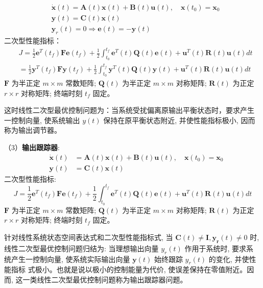 \documentclass[UTF8]{ctexart}
\begin{document}
  $$
  \begin{aligned}
  &\dot{\boldsymbol{x}}(t)=\boldsymbol{A}(t) \boldsymbol{x}(t)+\boldsymbol{B}(t) \boldsymbol{u}(t), \quad \boldsymbol{x}\left(t_{0}\right)=\boldsymbol{x}_{0}\\
  &\boldsymbol{y}(t)=\boldsymbol{C}(t) \boldsymbol{x}(t) \\
  &\boldsymbol{y}_{r}(t)=0 \Rightarrow \boldsymbol{e}(t)=-\boldsymbol{y}(t)
  \end{aligned}
  $$
  二次型性能指标：
  $$
  \begin{aligned}
  &J=\frac{1}{2} \boldsymbol{e}^{T}\left(t_{f}\right) \boldsymbol{F e}\left(t_{f}\right)+\frac{1}{2} \int_{t_{0}}^{t_{f}} \boldsymbol{e}^{T}(t) \boldsymbol{Q}(t) \boldsymbol{e}(t)+\boldsymbol{u}^{T}(t) \boldsymbol{R}(t) \boldsymbol{u}(t) d t \\
  &=\frac{1}{2} \boldsymbol{y}^{T}\left(t_{f}\right) \boldsymbol{F} \boldsymbol{y}\left(t_{f}\right)+\frac{1}{2} \int_{t_{0}}^{t_{f}} \boldsymbol{y}^{T}(t) \boldsymbol{Q}(t) \boldsymbol{y}(t)+\boldsymbol{u}^{T}(t) \boldsymbol{R}(t) \boldsymbol{u}(t) d t
  \end{aligned}
  $$
  $\boldsymbol{F}$ 为半正定 $m \times m$ 常数矩阵; $\boldsymbol{Q}(t)$ 为半正定 $m \times m$ 对称矩阵; $\boldsymbol{R}(t)$ 为正定 $r \times r$ 对称矩阵; 终端时刻 $t_{f}$ 固定。
  
  这时线性二次型最优控制问题为：当系统受扰偏离原输出平衡状态时，要求产生 一控制向量, 使系统输出 $y(t)$ 保持在原平衡状态附近, 并使性能指标极小, 因而 称为输出调节器。
  \par （3）\textbf{输出跟踪器}:
  $$\quad \begin{aligned} \dot{\boldsymbol{x}}(t) &=\boldsymbol{A}(t) \boldsymbol{x}(t)+\boldsymbol{B}(t) \boldsymbol{u}(t), \quad \boldsymbol{x}\left(t_{0}\right)=\boldsymbol{x}_{0} \\ \boldsymbol{y}(t) &=\boldsymbol{C}(t) \boldsymbol{x}(t) \end{aligned}$$
  二次型性能指标: $$\quad J=\frac{1}{2} \boldsymbol{e}^{T}\left(t_{f}\right) \boldsymbol{F e}\left(t_{f}\right)+\frac{1}{2} \int_{t_{0}}^{t_{f}} \boldsymbol{e}^{T}(t) \boldsymbol{Q}(t) \boldsymbol{e}(t)+\boldsymbol{u}^{T}(t) \boldsymbol{R}(t) \boldsymbol{u}(t) d t \quad $$
  $\boldsymbol{F}$ 为半正定 $m \times m$ 常数矩阵; $\boldsymbol{Q}(t)$ 为半正定 $m \times m$ 对称矩阵; $\boldsymbol{R}(t)$ 为正定 $r \times r$ 对称矩阵; 终端时刻 $t_{f}$ 固定。
  
  针对线性系统状态空间表达式和二次型性能指标式, 当 $\boldsymbol{C}(t) \neq \boldsymbol{I}, \boldsymbol{y}_{\boldsymbol{r}}(t) \neq 0$ 时, 线性二次型最优控制问题归结为: 当理想输出向量 $y_{r}(t)$ 作用于系统时, 要求系 统产生一控制向量, 使系统实际输出向量 $\boldsymbol{y}(t)$ 始终跟踪 $y_{r}(t)$ 的变化, 并使性能指标 式极小。也就是说以极小的控制能量为代价, 使误差保持在零值附近。因而, 这一类线性二次型最优控制问题称为输出跟踪器问题。
\end{document}
